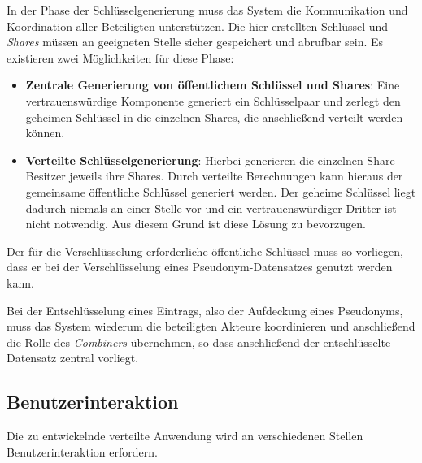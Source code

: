 In der Phase der Schlüsselgenerierung muss das System die Kommunikation und Koordination aller Beteiligten unterstützen. Die hier erstellten Schlüssel und \textit{Shares} müssen an geeigneten Stelle sicher gespeichert und abrufbar sein. Es existieren zwei Möglichkeiten für diese Phase:
\begin{itemize}
  \item \textbf{Zentrale Generierung von öffentlichem Schlüssel und Shares}: Eine vertrauenswürdige Komponente generiert ein Schlüsselpaar und zerlegt den geheimen Schlüssel in die einzelnen Shares, die anschließend verteilt werden können. 
  \item \textbf{Verteilte Schlüsselgenerierung}: Hierbei generieren die einzelnen Share-Besitzer jeweils ihre Shares. Durch verteilte Berechnungen kann hieraus der gemeinsame öffentliche Schlüssel generiert werden. Der geheime Schlüssel liegt dadurch niemals an einer Stelle vor und ein vertrauenswürdiger Dritter ist nicht notwendig. Aus diesem Grund ist diese Lösung zu bevorzugen.
\end{itemize}

Der für die Verschlüsselung erforderliche öffentliche Schlüssel muss so vorliegen, dass er bei der Verschlüsselung eines Pseudonym-Datensatzes genutzt werden kann.

Bei der Entschlüsselung eines Eintrags, also der Aufdeckung eines Pseudonyms, muss das System wiederum die beteiligten Akteure koordinieren und anschließend die Rolle des \textit{Combiners} übernehmen, so dass anschließend der entschlüsselte Datensatz zentral vorliegt.

\subsection{Benutzerinteraktion}

\label{subsec_impl_requirements_userinteraction}




Die zu entwickelnde verteilte Anwendung wird an verschiedenen Stellen Benutzerinteraktion erfordern.

